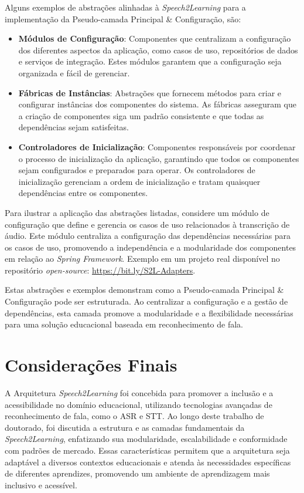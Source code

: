 Alguns exemplos de abstrações alinhadas à \textit{Speech2Learning} para a implementação da Pseudo-camada Principal \& Configuração, são:

\begin{itemize}
    \item \textbf{Módulos de Configuração}: Componentes que centralizam a configuração dos diferentes aspectos da aplicação, como casos de uso, repositórios de dados e serviços de integração. Estes módulos garantem que a configuração seja organizada e fácil de gerenciar.

    \item \textbf{Fábricas de Instâncias}: Abstrações que fornecem métodos para criar e configurar instâncias dos componentes do sistema. As fábricas asseguram que a criação de componentes siga um padrão consistente e que todas as dependências sejam satisfeitas.

    \item \textbf{Controladores de Inicialização}: Componentes responsáveis por coordenar o processo de inicialização da aplicação, garantindo que todos os componentes sejam configurados e preparados para operar. Os controladores de inicialização gerenciam a ordem de inicialização e tratam quaisquer dependências entre os componentes.
\end{itemize}

Para ilustrar a aplicação das abstrações listadas, considere um módulo de configuração que define e gerencia os casos de uso relacionados à transcrição de áudio. Este módulo centraliza a configuração das dependências necessárias para os casos de uso, promovendo a independência e a modularidade dos componentes em relação ao \textit{Spring Framework}. Exemplo em um projeto real disponível no repositório \textit{open-source}: \url{https://bit.ly/S2L-Adapters}.

Estas abstrações e exemplos demonstram como a Pseudo-camada Principal \& Configuração pode ser estruturada. Ao centralizar a configuração e a gestão de dependências, esta camada promove a modularidade e a flexibilidade necessárias para uma solução educacional baseada em reconhecimento de fala.

\section{Considerações Finais}

A Arquitetura \textit{Speech2Learning} foi concebida para promover a inclusão e a acessibilidade no domínio educacional, utilizando tecnologias avançadas de reconhecimento de fala, como o ASR e STT. Ao longo deste trabalho de doutorado, foi discutida a estrutura e as camadas fundamentais da \textit{Speech2Learning}, enfatizando sua modularidade, escalabilidade e conformidade com padrões de mercado. Essas características permitem que a arquitetura seja adaptável a diversos contextos educacionais e atenda às necessidades específicas de diferentes aprendizes, promovendo um ambiente de aprendizagem mais inclusivo e acessível.

